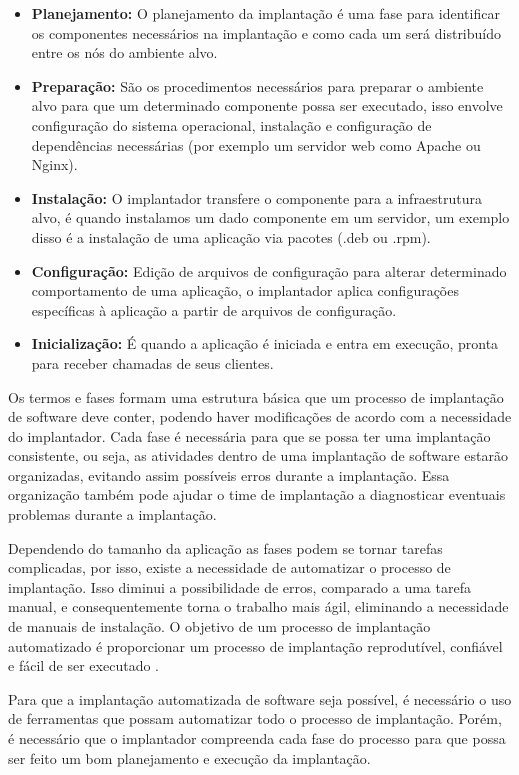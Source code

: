 \begin{itemize}
  \item  \textbf{Planejamento:} O planejamento da implantação é uma fase
  para identificar os componentes necessários na implantação e como cada um será
  distribuído entre os nós do ambiente alvo.
  \item  \textbf{Preparação:} São os procedimentos necessários para preparar o
  ambiente alvo para que um determinado componente possa ser executado, isso envolve
  configuração do sistema operacional, instalação e configuração de dependências
  necessárias (por exemplo um servidor web como Apache ou Nginx). 
  \item  \textbf{Instalação:} O implantador transfere o componente para a infraestrutura
  alvo, é quando instalamos um dado componente em um servidor, um exemplo disso
  é a instalação de uma aplicação via pacotes (.deb ou .rpm).
  \item  \textbf{Configuração:} Edição de arquivos de configuração para alterar
  determinado comportamento de uma aplicação, o implantador aplica configurações
  específicas à aplicação a partir de arquivos de configuração.
  \item  \textbf{Inicialização:} É quando a aplicação é iniciada e entra em execução,
  pronta para receber chamadas de seus clientes.
\end{itemize}

Os termos e fases formam uma estrutura básica que um processo de implantação de software
deve conter, podendo haver modificações de acordo com a necessidade do implantador. 
Cada fase é necessária para que se possa ter uma implantação consistente, ou seja, as
atividades dentro de uma implantação de software estarão organizadas, evitando assim
possíveis erros durante a implantação. Essa organização também pode ajudar o
time de implantação a diagnosticar eventuais problemas durante a implantação.

Dependendo do tamanho da aplicação as fases podem se tornar tarefas complicadas,
por isso, existe a necessidade de automatizar o processo de implantação. Isso 
diminui a possibilidade de erros, comparado a uma tarefa manual, e consequentemente
torna o trabalho mais ágil, eliminando a necessidade de manuais de instalação. 
O objetivo de um processo de implantação automatizado é proporcionar um processo
 de implantação reprodutível, confiável e fácil de ser executado \cite{humble2010}.

Para que a implantação automatizada de software seja possível, é necessário o uso
de ferramentas que possam automatizar todo o processo de implantação. Porém, é 
necessário que o implantador compreenda cada fase do processo para que possa ser
feito um bom planejamento e execução da implantação.

